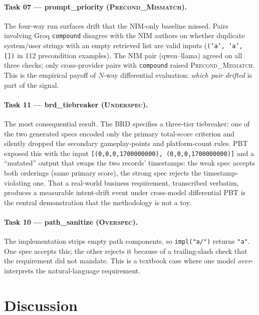 \documentclass[11pt,a4paper]{article}
\begin{document}
\paragraph{Task 07 — prompt\_priority (\textsc{Precond\_Mismatch}).}
The four-way run surfaces drift that the NIM-only baseline missed.
Pairs involving Groq \texttt{compound} disagree with the NIM authors
on whether duplicate system/user strings with an empty retrieved list
are valid inputs (\texttt{('a', 'a', [])} in 112 precondition
examples). The NIM pair (qwen--llama) agreed on all three checks;
only cross-provider pairs with \texttt{compound} raised
\textsc{Precond\_Mismatch}. This is the empirical payoff of
$N$-way differential evaluation: \emph{which pair drifted} is part
of the signal.

\paragraph{Task 11 — brd\_tiebreaker (\textsc{Underspec}).}
The most consequential result. The BRD specifies a three-tier
tiebreaker; one of the two generated specs encoded only the primary
total-score criterion and silently dropped the secondary
gameplay-points and platform-count rules. PBT exposed this with the
input \texttt{[(0,0,0,1700000000), (0,0,0,1700000000)]} and a
``mutated'' output that swaps the two records' timestamps: the weak
spec accepts both orderings (same primary score), the strong spec
rejects the timestamp-violating one. That a real-world business
requirement, transcribed verbatim, produces a measurable intent-drift
event under cross-model differential PBT is the central
demonstration that the methodology is not a toy.

\paragraph{Task 10 — path\_sanitize (\textsc{Overspec}).}
The implementation strips empty path components, so
\texttt{impl("a/")} returns \texttt{"a"}. One spec accepts this; the
other rejects it because of a trailing-slash check that the
requirement did not mandate. This is a textbook case where one model
\emph{over}-interprets the natural-language requirement.

\section{Discussion}
\end{document}
